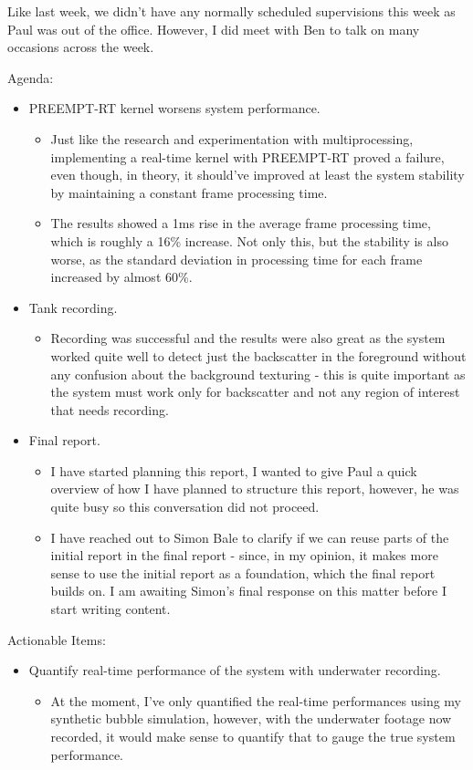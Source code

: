 Like last week, we didn't have any normally scheduled supervisions this week as Paul was out of the office. However, I did meet with Ben to talk on many occasions across the week.

Agenda:

\begin{itemize}
    \item PREEMPT-RT kernel worsens system performance.
    \begin{itemize}
        \item Just like the research and experimentation with multiprocessing, implementing a real-time kernel with PREEMPT-RT proved a failure, even though, in theory, it should've improved at least the system stability by maintaining a constant frame processing time.
        \item The results showed a 1ms rise in the average frame processing time, which is roughly a 16\% increase. Not only this, but the stability is also worse, as the standard deviation in processing time for each frame increased by almost 60\%.
    \end{itemize}

    \item Tank recording.
    \begin{itemize}
        \item Recording was successful and the results were also great as the system worked quite well to detect just the backscatter in the foreground without any confusion about the background texturing - this is quite important as the system must work only for backscatter and not any region of interest that needs recording.
    \end{itemize}

    \item Final report.
    \begin{itemize}
        \item I have started planning this report, I wanted to give Paul a quick overview of how I have planned to structure this report, however, he was quite busy so this conversation did not proceed.
        \item I have reached out to Simon Bale to clarify if we can reuse parts of the initial report in the final report - since, in my opinion, it makes more sense to use the initial report as a foundation, which the final report builds on. I am awaiting Simon's final response on this matter before I start writing content.
    \end{itemize}
\end{itemize}

Actionable Items:

\begin{itemize}
    \item Quantify real-time performance of the system with underwater recording.
    \begin{itemize}
        \item At the moment, I've only quantified the real-time performances using my synthetic bubble simulation, however, with the underwater footage now recorded, it would make sense to quantify that to gauge the true system performance.
    \end{itemize}
\end{itemize}
